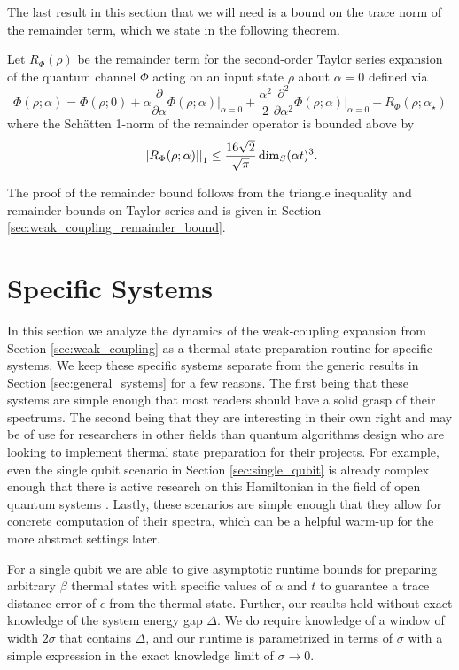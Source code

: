 The last result in this section that we will need is a bound on the trace norm of the remainder term, which we state in the following theorem.
\begin{theorem} \label{thm:remainder_bound}
    Let $R_{\Phi}(\rho)$ be the remainder term for the second-order Taylor series expansion 
of the quantum channel $\Phi$ acting on an input state $\rho$ about $\alpha=0$ defined via
    $$\Phi(\rho; \alpha) = \Phi(\rho; 0) + \alpha \frac{\partial}{\partial \alpha} \Phi(\rho; \alpha) \big|_{\alpha = 0} + \frac{\alpha^2}{2} \frac{\partial^2}{\partial \alpha^2} \Phi(\rho; \alpha) \big|_{\alpha = 0} + R_{\Phi}(\rho; \alpha_{\star})$$ where the Sch\"{a}tten 1-norm of the remainder operator is bounded above by
    \begin{equation}
        \left| \left| R_{\Phi}(\rho;\alpha) \right| \right|_1 \le \frac{16 \sqrt{2}}{\sqrt{\pi}} \dim_S (\alpha t)^3.
    \end{equation}
\end{theorem}
The proof of the remainder bound follows from the triangle inequality and remainder bounds on Taylor series and is given in Section \ref{sec:weak_coupling_remainder_bound}.



\section{Specific Systems} \label{sec:specific_systems}
In this section we analyze the dynamics of the weak-coupling expansion from Section \ref{sec:weak_coupling} as a thermal state preparation routine for specific systems. We keep these specific systems separate from the generic results in Section \ref{sec:general_systems} for a few reasons. The first being that these systems are simple enough that most readers should have a solid grasp of their spectrums. The second being that they are interesting in their own right and may be of use for researchers in other fields than quantum algorithms design who are looking to implement thermal state preparation for their projects. For example, even the single qubit scenario in Section \ref{sec:single_qubit} is already complex enough that there is active research on this Hamiltonian in the field of open quantum systems \cite{prositto2025equilibrium}. Lastly, these scenarios are simple enough that they allow for concrete computation of their spectra, which can be a helpful warm-up for the more abstract settings later.

For a single qubit we are able to give asymptotic runtime bounds for preparing arbitrary $\beta$ thermal states with specific values of $\alpha$ and $t$ to guarantee a trace distance error of $\epsilon$ from the thermal state. Further, our results hold without exact knowledge of the system energy gap $\Delta$. We do require knowledge of a window of width $2 \sigma$ that contains $\Delta$, and our runtime is parametrized in terms of $\sigma$ with a simple expression in the exact knowledge limit of $\sigma \to 0$.

